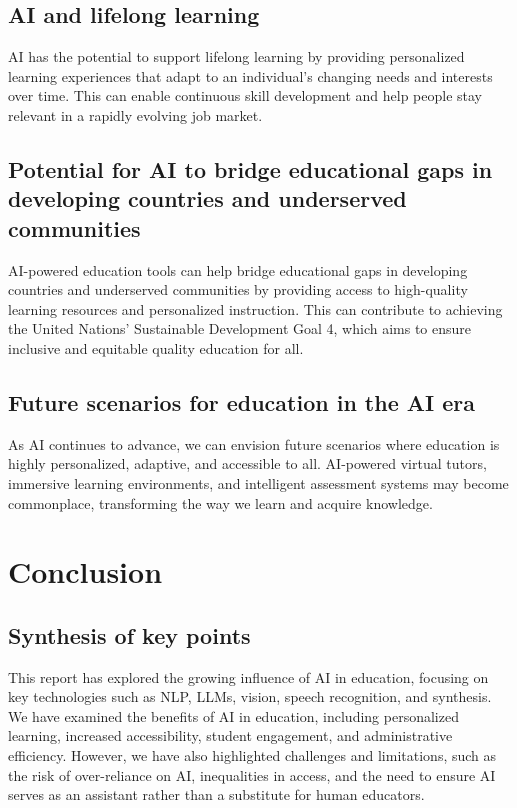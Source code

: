 \documentclass{article}
\begin{document}
\subsection{AI and lifelong learning}
AI has the potential to support lifelong learning by providing personalized learning experiences that adapt to an individual's changing needs and interests over time. This can enable continuous skill development and help people stay relevant in a rapidly evolving job market.

\subsection{Potential for AI to bridge educational gaps in developing countries and underserved communities}
AI-powered education tools can help bridge educational gaps in developing countries and underserved communities by providing access to high-quality learning resources and personalized instruction. This can contribute to achieving the United Nations' Sustainable Development Goal 4, which aims to ensure inclusive and equitable quality education for all.

\subsection{Future scenarios for education in the AI era}
As AI continues to advance, we can envision future scenarios where education is highly personalized, adaptive, and accessible to all. AI-powered virtual tutors, immersive learning environments, and intelligent assessment systems may become commonplace, transforming the way we learn and acquire knowledge.

\section{Conclusion}

\subsection{Synthesis of key points}
This report has explored the growing influence of AI in education, focusing on key technologies such as NLP, LLMs, vision, speech recognition, and synthesis. We have examined the benefits of AI in education, including personalized learning, increased accessibility, student engagement, and administrative efficiency. However, we have also highlighted challenges and limitations, such as the risk of over-reliance on AI, inequalities in access, and the need to ensure AI serves as an assistant rather than a substitute for human educators.
\end{document}
